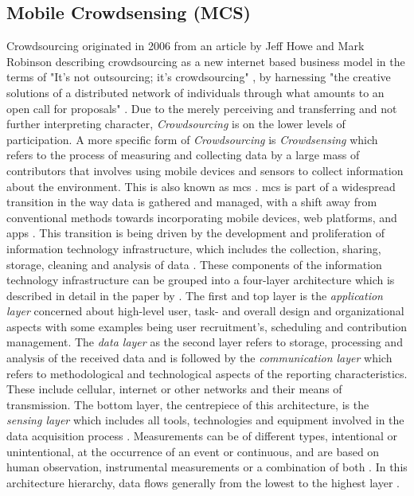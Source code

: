 \subsection{Mobile Crowdsensing (MCS)}\label{subsec:mcs}

Crowdsourcing originated in 2006 from an article by Jeff Howe and Mark Robinson describing crowdsourcing as a new internet based business model in the terms of "It's not outsourcing; it's crowdsourcing" \autocite{howeRiseCrowdsourcing2006}, by harnessing "the creative solutions of a distributed network of individuals through what amounts to an open call for proposals" \autocite[76]{brabhamCrowdsourcingModelProblem2008}. Due to the merely perceiving and transferring and not further interpreting character, \textit{Crowdsourcing} is on the lower levels of participation. A more specific form of \textit{Crowdsourcing} is \textit{Crowdsensing} which refers to the process of measuring and collecting data by a large mass of contributors that involves using mobile devices and sensors to collect information about the environment. This is also known as \acrfull{mcs} \autocite{guoParticipatorySensingMobile2014, liuSurveyMobileCrowdsensing2018}.\newline
\acrshort{mcs} is part of a widespread transition in the way data is gathered and managed, with a shift away from conventional methods towards incorporating mobile devices, web platforms, and apps \autocite{capponiSurveyMobileCrowdsensing2019, sanllorentecapdevilaSuccessFactorsCitizen2020}. This transition is being driven by the development and proliferation of information technology infrastructure, which includes the collection, sharing, storage, cleaning and analysis of data \autocite{fraislCitizenScienceEnvironmental2022}. These components of the information technology infrastructure can be grouped into a four-layer architecture which is described in detail in the paper by \autocite{capponiSurveyMobileCrowdsensing2019}.
The first and top layer is the \textit{application layer} concerned about high-level user, task- and overall design and organizational aspects with some examples being user recruitment's, scheduling and contribution management. The \textit{data layer} as the second layer refers to storage, processing and analysis of the received data and is followed by the \textit{communication layer} which refers to methodological and technological aspects of the reporting characteristics. These include cellular, internet or other networks and their means of transmission. The bottom layer, the centrepiece of this architecture, is the \textit{sensing layer} which includes all tools, technologies and equipment involved in the data acquisition process \autocite{capponiSurveyMobileCrowdsensing2019}. Measurements can be of different types, intentional or unintentional, at the occurrence of an event or continuous, and are based on human observation, instrumental measurements or a combination of both \autocite{zhengCrowdsourcingMethodsData2018}. In this architecture hierarchy, data flows generally from the lowest to the highest layer \autocite{aceves-buenoCitizenScienceApproach2015,capponiSurveyMobileCrowdsensing2019,zhengCrowdsourcingMethodsData2018}.\newline
